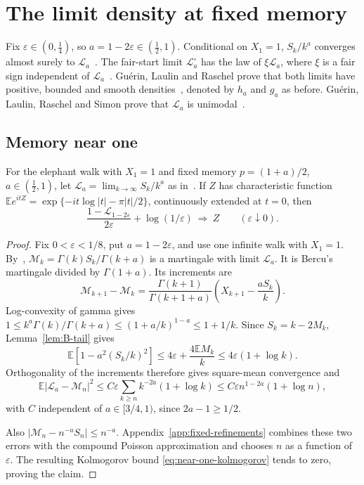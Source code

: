 \section{The limit density at fixed memory}\label{sec:bulk-applications}

Fix $\varepsilon\in(0,\frac14)$, so $a=1-2\varepsilon\in(\frac12,1)$.
Conditional on $X_1=1$, $S_k/k^a$ converges almost surely to
$\mathcal L_a$~\cite[Theorem~3.7]{bercu2018}. The fair-start limit
$\mathcal L^\circ_a$ has the law of $\xi\mathcal L_a$, where $\xi$ is a fair sign independent of
$\mathcal L_a$~\cite[(1.3) and (1.6)]{glr2026}. Gu\'erin, Laulin and Raschel
prove that both limits have positive, bounded and smooth
densities~\cite[Theorem~1.3]{glr2026}, denoted by $h_a$ and $g_a$ as before.
Gu\'erin, Laulin, Raschel and Simon prove
that $\mathcal L_a$ is unimodal~\cite[Theorem~1.1]{glrs2025}.

\subsection{Memory near one}

\begin{corollary}\label{cor:fixed-memory-bridge}
For the elephant walk with $X_1=1$ and fixed memory $p=(1+a)/2$,
$a\in(\frac12,1)$, let $\mathcal L_a=\lim_{k\to\infty}S_k/k^a$
as in~\cite[Theorem~3.7]{bercu2018}. If $Z$ has characteristic function
$\mathbb E e^{itZ}=\exp\{-it\log|t|-\pi|t|/2\}$, continuously extended at
$t=0$, then
\[
 \frac{1-\mathcal L_{1-2\varepsilon}}{2\varepsilon}
       +\log(1/\varepsilon)\ \Longrightarrow\ Z
       \qquad(\varepsilon\downarrow0).
\]
\end{corollary}

\begin{proof}
Fix $0<\varepsilon<1/8$, put $a=1-2\varepsilon$, and use one infinite
walk with $X_1=1$. By~\cite[(2.4), Appendix~A]{bercu2018},
$\mathcal M_k=\Gamma(k)S_k/\Gamma(k+a)$ is a martingale with limit
$\mathcal L_a$. It is Bercu's martingale divided by $\Gamma(1+a)$.
Its increments are
\[
 \mathcal M_{k+1}-\mathcal M_k
 =\frac{\Gamma(k+1)}{\Gamma(k+1+a)}
       \left(X_{k+1}-\frac{aS_k}{k}\right).
\]
Log-convexity of gamma gives
$1\le k^a\Gamma(k)/\Gamma(k+a)\le(1+a/k)^{1-a}\le1+1/k$.
Since $S_k=k-2M_k$, Lemma~\ref{lem:B-tail} gives
\[
 \mathbb E\!\left[1-a^2(S_k/k)^2\right]
 \le4\varepsilon+\frac{4\mathbb EM_k}{k}
 \le4\varepsilon(1+\log k).
\]
Orthogonality of the increments therefore gives square-mean convergence and
\[
 \mathbb E|\mathcal L_a-\mathcal M_n|^2
 \le C\varepsilon\sum_{k\ge n}k^{-2a}(1+\log k)
 \le C\varepsilon n^{1-2a}(1+\log n),
\]
with $C$ independent of $a\in[3/4,1)$, since $2a-1\ge1/2$.

Also $|\mathcal M_n-n^{-a}S_n|\le n^{-a}$.
Appendix~\ref{app:fixed-refinements} combines these two errors with
the compound Poisson approximation and chooses $n$ as a function of
$\varepsilon$. The resulting Kolmogorov bound
\eqref{eq:near-one-kolmogorov} tends to zero, proving the claim.
\end{proof}

